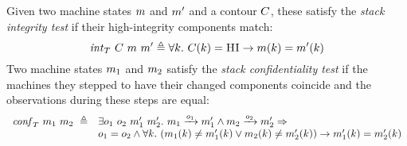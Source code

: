 \documentclass[acmsmall,review,anonymous]{acmart}\settopmatter{printfolios=true,printccs=false,printacmref=false}
\begin{document}
{\newcommand*{\vm}[1]{\ensuremath{\mathit{vm}_{#1}}}
\newcommand*{\testInt}[3]{\ensuremath{\mathit{int}_T ~ #1 ~ #2 ~ #3}}
\newcommand*{\testConf}[2]{\ensuremath{\mathit{conf}_T ~ #1 ~ #2}}
\newcommand*{\testVS}[2]{\ensuremath{\mathit{\vs}_T ~ #1 ~ #2}}
\newcommand*{\testProp}[3]{\ensuremath{\mathit{stack}_T ~ #1 ~ #2 ~ #3}}

  Given two machine states $m$ and $m'$ and a contour $C$, these
  satisfy the \emph{stack integrity test} if their high-integrity components
  match:
  \[
    \testInt{\contour}{\mach}{\mach'} \triangleq
    \forall \component . ~
    \contour(\component) = \HIGHINT \rightarrow
    \mach(\component) = \mach'(\component)
    \]
    \ifaftersubmission
{}
\fi
{} Two machine states $m_1$ and $m_2$ satisfy the
\emph{stack confidentiality test} if the machines they stepped to
have their changed components coincide and the observations during
these steps are equal:
\[
\begin{array}{rl}
  \mathit{conf}_T ~ m_1 ~ m_2 ~ \triangleq &
  \exists o_1 ~ o_2 ~ m_1' ~ m_2'. ~
  m_1 \xrightarrow{o_1} m_1' \wedge m_2 \xrightarrow{o_2} m_2' \Rightarrow \\
&    o_1 = o_2 \wedge \forall k . ~
   (     m_1(k) \neq m_1'(k)
    \vee m_2(k) \neq m_2'(k))
    \rightarrow m_1'(k) = m_2'(k)
\end{array}
\]
\ifaftersubmission
{}
\fi

}
\end{document}
